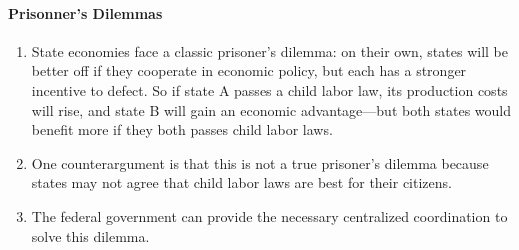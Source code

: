 \paragraph{Prisonner's Dilemmas}

\begin{enumerate}
    \item State economies face a classic prisoner's dilemma: on their own, 
    states will be better off if they cooperate in economic policy, but each 
    has a stronger incentive to defect. So if state A passes a child labor 
    law, its production costs will rise, and state B will gain an economic 
    advantage---but both states would benefit more if they both passes child 
    labor laws.
    \item One counterargument is that this is not a true prisoner's dilemma 
    because states may not agree that child labor laws are best for their 
    citizens.
    \item The federal government can provide the necessary centralized 
    coordination to solve this dilemma.
\end{enumerate}

